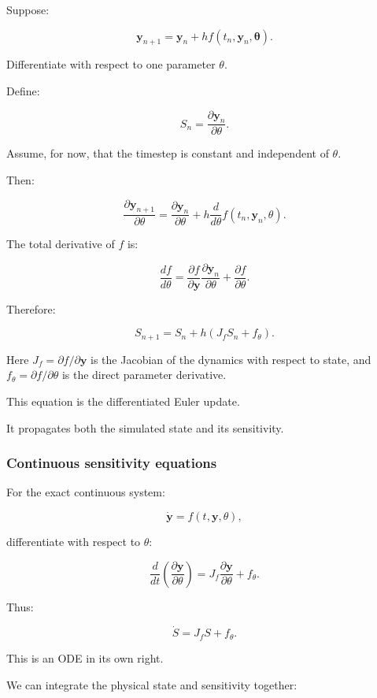 Suppose:

\[
\mathbf y_{n+1} = \mathbf y_n+ h f(t_n,\mathbf y_n,\boldsymbol\theta).
\]

Differentiate with respect to one parameter \(\theta\).

Define:

\[
S_n=\frac{\partial\mathbf y_n}{\partial\theta}.
\]

Assume, for now, that the timestep is constant and independent of \(\theta\).

Then:

\[
\frac{\partial\mathbf y_{n+1}}{\partial\theta} = \frac{\partial\mathbf y_n}{\partial\theta} + h\frac{d}{d\theta} f(t_n,\mathbf y_n,\theta).
\]

The total derivative of \(f\) is:

\[
\frac{df}{d\theta} = \frac{\partial f}{\partial\mathbf y} \frac{\partial\mathbf y_n}{\partial\theta} + \frac{\partial f}{\partial\theta}.
\]

Therefore:

\[
\boxed{ S_{n+1} = S_n+ h\left(J_fS_n+f_\theta\right) }.
\]

Here \(J_f=\partial f/\partial\mathbf y\) is the Jacobian of the dynamics with respect to state, and \(f_\theta=\partial f/\partial\theta\) is the direct parameter derivative.

This equation is the differentiated Euler update.

It propagates both the simulated state and its sensitivity.

\subsubsection{Continuous sensitivity equations}\label{02-foundations-ii-ch022-continuous-sensitivity-equations}

For the exact continuous system:

\[
\dot{\mathbf y}=f(t,\mathbf y,\theta),
\]

differentiate with respect to \(\theta\):

\[
\frac{d}{dt} \left( \frac{\partial\mathbf y}{\partial\theta} \right) = J_f \frac{\partial\mathbf y}{\partial\theta} + f_\theta.
\]

Thus:

\[
\boxed{ \dot S=J_fS+f_\theta }.
\]

This is an ODE in its own right.

We can integrate the physical state and sensitivity together:

